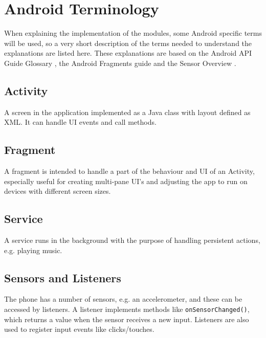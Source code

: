\section{Android Terminology}
When explaining the implementation of the modules, some Android specific terms will be used, so a very short description of the terms needed to understand the explanations are listed here. These explanations are based on the Android API Guide Glossary \cite{android:terms}, the Android Fragments guide \cite{android:fragment} and the Sensor Overview \cite{android:sensor}.

\subsection*{Activity}
A screen in the application implemented as a Java class with layout defined as XML. It can handle UI events and call methods.

\subsection*{Fragment}
A fragment is intended to handle a part of the behaviour and UI of an Activity, especially useful for creating multi-pane UI's and adjusting the app to run on devices with different screen sizes.

\subsection*{Service}
A service runs in the background with the purpose of handling persistent actions, e.g. playing music.

\subsection*{Sensors and Listeners}
The phone has a number of sensors, e.g. an accelerometer, and these can be accessed by listeners. A listener implements methods like \texttt{onSensorChanged()}, which returns a value when the sensor receives a new input. Listeners are also used to register input events like clicks/touches.